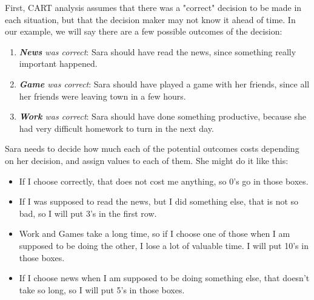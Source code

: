 
First, CART analysis assumes that there was a "correct" decision to be made in each situation, but that the decision maker may not know it ahead of time. In our example, we will say there are a few possible outcomes of the decision:
\begin{enumerate}[1.]
\item \emph{\textbf{News} was correct}: Sara should have read the news, since something really important happened.
\item \emph{\textbf{Game} was correct}: Sara should have played a game with her friends, since all her friends were leaving town in a few hours.
\item \emph{\textbf{Work} was correct}: Sara should have done something productive, because she had very difficult homework to turn in the next day.
\end{enumerate}

Sara needs to decide how much each of the potential outcomes costs depending on her decision, and assign values to each of them. She might do it like this: \\

\begin{itemize}
\item If I choose correctly, that does not cost me anything, so 0's go in those boxes.
\item If I was supposed to read the news, but I did something else, that is not so bad, so I will put 3's in the first row.
\item Work and Games take a long time, so if I choose one of those when I am supposed to be doing the other, I lose a lot of valuable time. I will put 10's in those boxes.
\item If I choose news when I am supposed to be doing something else, that doesn't take so long, so I will put 5's in those boxes.
\end{itemize}



























